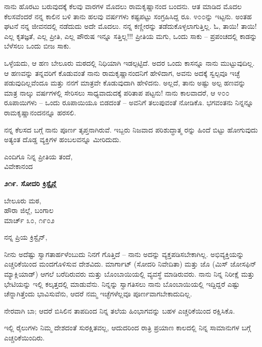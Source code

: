 ನಾನು ಹೊರಟು ಬರುವುದಕ್ಕೆ ಕೆಲವು ವಾರಗಳ ಮೊದಲು ರಾಮಕೃಷ್ಣಾನಂದ ಬಂದನು. ಆತ ಮಾಡಿದ ಮೊದಲ ಕೆಲಸವೆಂದರೆ ನನ್ನ ಕಾಲಿನ ಬಳಿ ತಾನು ಹಲವು ವರ್ಷಗಳು ಕಷ್ಟಪಟ್ಟು ಸಂಗ್ರಹಿಸಿದ್ದ ರೂ. ೪೦೦ನ್ನು ಇಟ್ಟನು. ಅಂತಹ ಘಟನೆ ನನ್ನ ಜೀವನದಲ್ಲಿ ನಡೆದುದು ಅದೇ ಮೊದಲು. ನನ್ನ ಕಣ್ಣೀರನ್ನು ತಡೆದುಕೊಳ್ಳಲಾಗುತ್ತಿಲ್ಲ. ಓ, ತಾಯಿ! ತಾಯಿ! ಎಲ್ಲ ಕೃತಜ್ಞತೆ, ಎಲ್ಲ ಪ್ರೀತಿ, ಎಲ್ಲ ಪೌರುಷ ಇನ್ನೂ ಸತ್ತಿಲ್ಲ!!! ಪ್ರೀತಿಯ ಮಗು, ಒಂದು ಸಾಕು – ಪ್ರಪಂಚದಲ್ಲಿ ಕಾಡನ್ನು ಬೆಳೆಸಲು ಒಂದು ಬೀಜ ಸಾಕು.

ಒಳ್ಳೆಯದು, ಆ ಹಣ ಬೇಲೂರು ಮಠದಲ್ಲಿ ನಿಧಿಯಾಗಿ ಇಡಲ್ಪಟ್ಟಿದೆ. ಅದರ ಒಂದು ಕಾಸನ್ನೂ ನಾನು ಮುಟ್ಟುವುದಿಲ್ಲ. ಆ ಹಣವನ್ನು ತನ್ನವರಿಗೆ ಕೊಡುವಂತೆ ನಾನು ರಾಮಕೃಷ್ಣಾನಂದನಿಗೆ ಹೇಳಿದಾಗ, ಅವನು ಅದಕ್ಕೆ ಸ್ವಲ್ಪವೂ ಇಚ್ಛೆ ಪಡುವುದಿಲ್ಲವೆಂದೂ ಮತ್ತು ನನಗೆ ಮಾತ್ರವೇ ಕೊಡುವುದಾಗಿ ಹೇಳಿದನು. ಅಲ್ಲದೆ, ತಾನು ಅಷ್ಟು ಅಲ್ಪ ಹಣವನ್ನು ಮಾತ್ರ ನಾಲ್ಕು ವರ್ಷಗಳಲ್ಲಿ ಸೇರಿಸಲು ಸಾಧ್ಯವಾದುದಕ್ಕೆ ಪರಿತಾಪ ಪಟ್ಟನು! ನಾನು ಕಾಲವಾದರೆ, ಆ ೪೦೦ ರೂಪಾಯಿಗಳು – ಒಂದು ರೂಪಾಯಿಯೂ ಬಿಡದಂತೆ – ಅವನಿಗೆ ತಲುಪುವಂತೆ ನೋಡಿಕೊ. ಭಗವಂತನು ನಿನ್ನನ್ನೂ ರಾಮಕೃಷ್ಣಾನಂದನನ್ನೂ ಹರಸಲಿ.

ನನ್ನ ಕೆಲಸದ ಬಗ್ಗೆ ನಾನು ಪೂರ್ಣ ತೃಪ್ತನಾಗಿರುವೆ. ಇಬ್ಬರು ನಿಜವಾದ ಪರಿಶುದ್ಧಾತ್ಮ ರನ್ನು ಹಿಂದೆ ಬಿಟ್ಟು ಹೋಗುವುದು ಅತ್ಯಂತ ದೊಡ್ಡ ವ್ಯಕ್ತಿಗಳ ಹಂಬಲವನ್ನೂ ಮೀರಿದುದು.

\begin{flushright}
ಎಂದಿಗೂ ನಿನ್ನ ಪ್ರೀತಿಯ ತಂದೆ,\\ವಿವೇಕಾನಂದ
\end{flushright}

\begin{center}
\textbf{೨೧೯. ಸೋದರಿ ಕ್ರಿಸ್ಟೈನ್ಗೆ}
\end{center}

\begin{flushright}
ಬೇಲೂರು ಮಠ,\\ಹೌರಾ ಜಿಲ್ಲೆ, ಬಂಗಾಲ\\ಮಾರ್ಚ್ ೩೦, ೧೯೦೨
\end{flushright}

ನನ್ನ ಪ್ರಿಯ ಕ್ರಿಸ್ಟೈನ್,

ನೀನು ಅದೆಷ್ಟು ಸ್ವಾಗತಾರ್ಹಳೆಂಬುದು ನಿನಗೆ ಗೊತ್ತಿದೆ – ನಾನು ಅದನ್ನು ವ್ಯಕ್ತಪಡಿಸಬೇಕಾಗಿಲ್ಲ. ಅಭಿವ್ಯಕ್ತಿಯನ್ನು ಎಚ್ಚರಿಕೆಯಿಂದ ಮಂದಗೊಳಿಸುವ ದೇಶವಿದು. ಮಾರ್ಗಾಟ್ (ಸೋದರಿ ನಿವೇದಿತಾ) ಮತ್ತು ಜೊ (ಮಿಸ್ ಜೋಸಫಿನ್ ಮ್ಯಾಕ್ಲಿಯಾಡ್) ಆಗಲೆ ಬರೆದಿರುವರು ಮತ್ತು ಬೊಂಬಾಯಿಯಲ್ಲಿ ವ್ಯವಸ್ಥೆ ಮಾಡಿರುವರು. ನಾನು ನಿನ್ನ ನಿರೀಕ್ಷೆ ಮತ್ತು ಭೇಟಿಯನ್ನು ಇಲ್ಲಿ ಕಲ್ಕತ್ತದಲ್ಲಿ ಮಾಡುವೆನು. ನಿನ್ನನ್ನು ಸ್ವಾಗತಿಸಲು ನಾನು ಬೊಂಬಾಯಿಯಲ್ಲಿ ಇದ್ದಿದ್ದರೆ ಎಷ್ಟು ಚೆನ್ನಾಗಿತ್ತೆಂದು ಭಾವಿಸುವೆನು, ಆದರೆ ನಮ್ಮ ಇಚ್ಛೆಗಳೆಲ್ಲವೂ ಪೂರ್ಣವಾಗಬೇಕಾದುದಿಲ್ಲ.

ನೇರವಾಗಿ ಬಾ; ಆದರೆ ಬಿಸಿಲಿನ ತಾಪದಿಂದ ನಿನ್ನ ತಲೆಯ ಹಿಂಭಾಗವನ್ನು ಬಹಳ ಎಚ್ಚರಿಕೆಯಿಂದ ರಕ್ಷಿಸಿಕೊ.

ಇಲ್ಲಿ ರೈಲುಗಳು ನಿಮ್ಮ ದೇಶದಂತೆ ಸುರಕ್ಷಿತವಲ್ಲ, ಆದುದರಿಂದ ರಾತ್ರಿ ಪ್ರಯಾಣ ಕಾಲದಲ್ಲಿ ನಿನ್ನ ಸಾಮಾನುಗಳ ಬಗ್ಗೆ ಎಚ್ಚರಿಕೆಯಿಂದಿರು.

